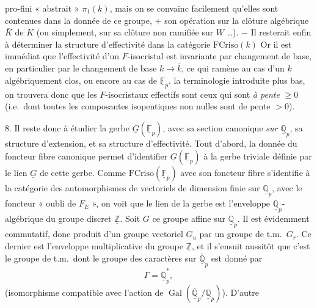 \documentclass[11pt,a4paper]{article}
\begin{document}

pro-fini « abstrait » $\pi_{1}(k)$, mais on se convainc facilement qu'elles
sont contenues dans la donnée de ce groupe, $+$ son opération sur la clôture
algébrique $\bar{K}$ de $K$ (ou simplement, sur sa clôture non ramifiée sur
$W$ …). $-$ Il resterait enfin à déterminer la structure d'effectivité
dans la catégorie $\mathrm{FCriso}(k)$  \add{\ill{}} \struck{\ill{}} Or il est immédiat que l'effectivité
d'un $F$-isocristal est invariante par changement de base, en particulier par
le changement de base $k \to \bar{k}$, ce qui ramène au cas d'un $k$
algébriquement clos, ou encore au cas de
$\underline{\mathbb{F}}_{p}$.  la terminologie
introduite plus bas, on trouvera donc que les $F$-isocristaux effectifs sont
ceux qui sont \emph{à pente} $\geq 0$ (i.e.\ dont toutes les composantes
isopentiques \struck{\ill{}} non nulles sont de pente $> 0$).


8. \quad Il reste donc à étudier la gerbe
$\underline{G}(\underline{\mathbb{F}}_{p})$, avec sa \struck{\ill{}}
\struck{\ill{}} section canonique \emph{sur $\underline{\mathbb{Q}}_{p}$},
sa structure d'extension, et sa structure d'effectivité.  Tout
d'abord, la donnée du foncteur fibre canonique permet d'identifier
$\underline{G}(\underline{\mathbb{F}}_{p})$ à la gerbe triviale définie par
le lien $\underline{G}$ de cette gerbe. Comme
$\mathrm{FCriso}(\underline{\mathbb{F}}_{p})$ avec son foncteur fibre
s'identifie à la catégorie des automorphismes  de vectoriels de
dimension finie  sur $\underline{\mathbb{Q}}_{p}$, avec le foncteur
« oubli de $F_{E}$ », on voit que le lien de la gerbe est l'enveloppe
$\underline{\mathbb{Q}}_{p}$-algébrique du groupe discret
$\underline{\mathbb{Z}}$. Soit $G$ ce groupe affine sur
$\underline{\mathbb{Q}}_{p}$. Il est évidemment commutatif, donc produit d'un
groupe vectoriel $G_{u}$ par un groupe de t.m.\ $G_{r}$. Ce dernier est
l'enveloppe  multiplicative du groupe $\underline{\mathbb{Z}}$,
et il s'ensuit aussitôt que c'est le groupe de t.m.\ dont le groupe des
caractères sur $\bar{\underline{\mathbb{Q}}}_{p}$ est donné par
\[
\Gamma = \bar{\underline{\mathbb{Q}}}^{*}_{p} ,
\]
(isomorphisme compatible avec l'action de
$\operatorname{Gal}(\bar{\underline{\mathbb{Q}}}_{p}/\underline{\mathbb{Q}}_{p})$).
D'autre
\end{document}
